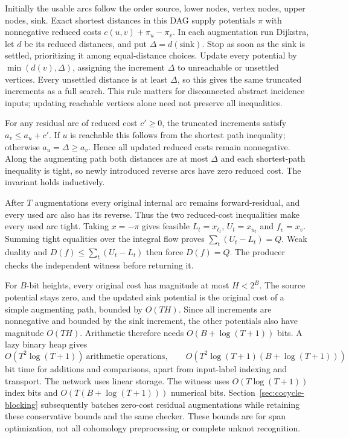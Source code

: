 Initially the usable arcs follow the order source, lower nodes, vertex
nodes, upper nodes, sink. Exact shortest distances in this DAG supply
potentials $\pi$ with nonnegative reduced costs
$c(u,v)+\pi_u-\pi_v$. In each augmentation run Dijkstra, let $d$ be its
reduced distances, and put $\Delta=d(\mathrm{sink})$. Stop as soon as the
sink is settled, prioritizing it among equal-distance choices. Update every potential
by $\min(d(v),\Delta)$, assigning the increment $\Delta$ to unreachable
or unsettled vertices. Every unsettled distance is at least $\Delta$, so
this gives the same truncated increments as a full search. This rule matters for disconnected abstract incidence
inputs; updating reachable vertices alone need not preserve all inequalities.

For any residual arc of reduced cost $c'\ge0$, the truncated increments
satisfy $a_v\le a_u+c'$. If $u$ is reachable this follows from the shortest
path inequality; otherwise $a_u=\Delta\ge a_v$. Hence all updated reduced
costs remain nonnegative. Along the augmenting path both distances are at
most $\Delta$ and each shortest-path inequality is tight, so newly introduced
reverse arcs have zero reduced cost. The invariant holds inductively.

After $T$ augmentations every original internal arc remains forward-residual,
and every used arc also has its reverse. Thus the two reduced-cost
inequalities make every used arc tight. Taking $x=-\pi$ gives feasible
$L_t=x_{\ell_t}$, $U_t=x_{u_t}$ and $f_v=x_v$. Summing tight equalities
over the integral flow proves $\sum_t(U_t-L_t)=Q$. Weak duality and
$D(f)\le\sum_t(U_t-L_t)$ then force $D(f)=Q$. The producer checks the
independent witness before returning it.

For $B$-bit heights, every original cost has magnitude at most $H<2^B$.
The source potential stays zero, and the updated sink potential is the
original cost of a simple augmenting path, bounded by $O(TH)$. Since all
increments are nonnegative and bounded by the sink increment, the other
potentials also have magnitude $O(TH)$. Arithmetic therefore needs
$O(B+\log(T+1))$ bits. A lazy binary heap gives
\[
 O(T^2\log(T+1))\ \text{arithmetic operations},\qquad
 O\!\left(T^2\log(T+1)(B+\log(T+1))\right)
\]
bit time for additions and comparisons, apart from input-label indexing
and transport. The network uses linear storage. The witness uses
$O(T\log(T+1))$ index bits and $O(T(B+\log(T+1)))$ numerical bits.
Section~\ref{sec:cocycle-blocking} subsequently batches zero-cost residual
augmentations while retaining these conservative bounds and the same checker.
These bounds are for span optimization, not all cohomology preprocessing
or complete unknot recognition.

